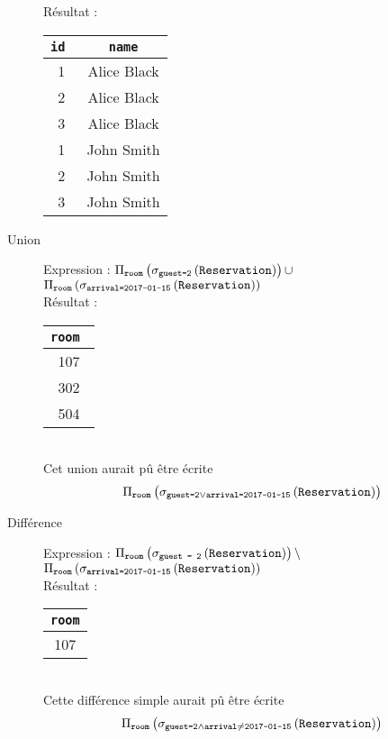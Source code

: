 \documentclass{cours}
\begin{document}
\begin{description}
    Résultat : \begin{tabular}{cc}
        \toprule
        \tt id & \tt name\\
        \midrule
        1 & Alice Black \\
        2 & Alice Black \\
        3 & Alice Black \\
        1 & John Smith \\
        2 & John Smith\\
        3 & John Smith\\
        \bottomrule
    \end{tabular}
    \item[Union]  Expression : $\Pi_{\texttt{room}}\left(\sigma_{\texttt{guest=2}}\left(\texttt{Reservation}\right)\right) \cup$\\
    $\Pi_{\texttt{room}}\left(\sigma_{\texttt{arrival=2017-01-15}}\left(\texttt{Reservation}\right)\right)$\\
    Résultat : 
    \begin{tabular}{c}
        \toprule
        \tt room \\
        \midrule 
        107\\
        302\\
        504\\
        \bottomrule
    \end{tabular}\\
    Cet union aurait pû être écrite 
    \[
        \Pi_{\texttt{room}}\left(\sigma_{\texttt{guest=2}\lor\texttt{arrival=2017-01-15}}\left(\texttt{Reservation}\right)\right)
    \]
    \item[Différence] Expression : $\Pi_{\texttt{room}}\left(\sigma_{\texttt{guest = 2}}\left(\texttt{Reservation}\right)\right)\setminus$\\
    $\Pi_{\texttt{room}}\left(\sigma_{\texttt{arrival=2017-01-15}}\left(\texttt{Reservation}\right)\right)$\\
    Résultat : \begin{tabular}{c}
        \toprule
        \tt room\\
        \midrule
        107\\
        \bottomrule
    \end{tabular}\\
    Cette différence simple aurait pû être écrite 
    \[
        \Pi_{\texttt{room}}\left(\sigma_{\texttt{guest=2}\land\texttt{arrival}\neq\texttt{2017-01-15}}\left(\texttt{Reservation}\right)\right)    
    \]


\end{description}
\end{document}
